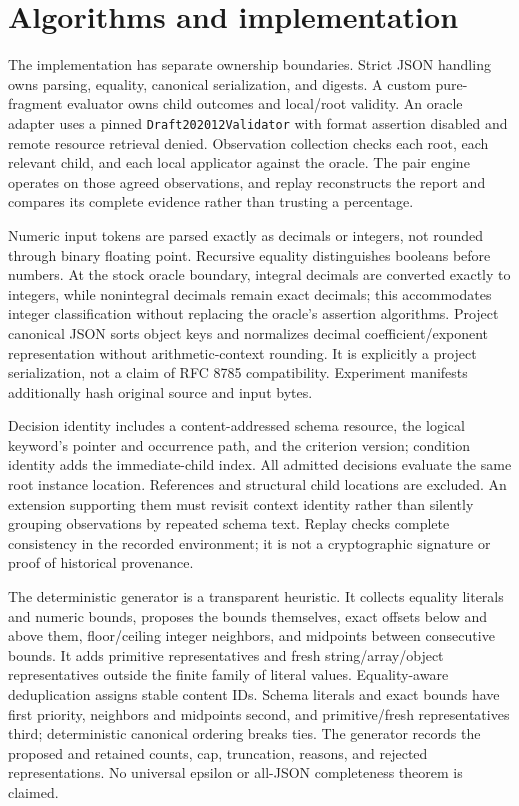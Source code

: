\documentclass[sigconf,nonacm]{acmart}
\begin{document}
\section{Algorithms and implementation}
The implementation has separate ownership boundaries. Strict JSON handling owns parsing, equality, canonical serialization, and digests. A custom pure-fragment evaluator owns child outcomes and local/root validity. An oracle adapter uses a pinned \texttt{D\allowbreak{}r\allowbreak{}a\allowbreak{}f\allowbreak{}t\allowbreak{}2\allowbreak{}0\allowbreak{}2\allowbreak{}0\allowbreak{}1\allowbreak{}2\allowbreak{}V\allowbreak{}a\allowbreak{}l\allowbreak{}i\allowbreak{}d\allowbreak{}a\allowbreak{}t\allowbreak{}o\allowbreak{}r} with format assertion disabled and remote resource retrieval denied. Observation collection checks each root, each relevant child, and each local applicator against the oracle. The pair engine operates on those agreed observations, and replay reconstructs the report and compares its complete evidence rather than trusting a percentage. \cite{ref19}

Numeric input tokens are parsed exactly as decimals or integers, not rounded through binary floating point. Recursive equality distinguishes booleans before numbers. At the stock oracle boundary, integral decimals are converted exactly to integers, while nonintegral decimals remain exact decimals; this accommodates integer classification without replacing the oracle's assertion algorithms. Project canonical JSON sorts object keys and normalizes decimal coefficient/exponent representation without arithmetic-context rounding. It is explicitly a project serialization, not a claim of RFC 8785 compatibility. Experiment manifests additionally hash original source and input bytes.

Decision identity includes a content-addressed schema resource, the logical keyword's pointer and occurrence path, and the criterion version; condition identity adds the immediate-child index. All admitted decisions evaluate the same root instance location. References and structural child locations are excluded. An extension supporting them must revisit context identity rather than silently grouping observations by repeated schema text. Replay checks complete consistency in the recorded environment; it is not a cryptographic signature or proof of historical provenance.

The deterministic generator is a transparent heuristic. It collects equality literals and numeric bounds, proposes the bounds themselves, exact offsets below and above them, floor/ceiling integer neighbors, and midpoints between consecutive bounds. It adds primitive representatives and fresh string/array/object representatives outside the finite family of literal values. Equality-aware deduplication assigns stable content IDs. Schema literals and exact bounds have first priority, neighbors and midpoints second, and primitive/fresh representatives third; deterministic canonical ordering breaks ties. The generator records the proposed and retained counts, cap, truncation, reasons, and rejected representations. No universal epsilon or all-JSON completeness theorem is claimed.
\end{document}
